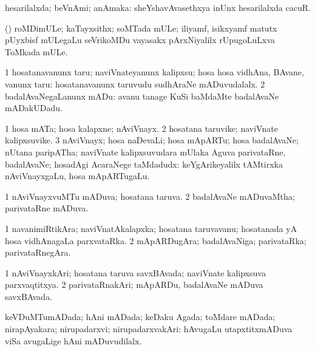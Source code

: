 \bentry
{}
\gl{\gu}
\bmng
hesarilalxda; beVnAmi; anAmaka:  sheYshavAvasethxya inUnx hesarilalxda cacuR. 
\emng
\eentry

\bentry
{}
\gl{\nA}
\bmng
(\aMrashA) roMDimULe; kaTayxsithx; soMTada mULe; iliyamf, isikxyamf matutx pUyxbisf mULegaLu seVrikoMDu vayasakx pArxNiyalilx rUpugoLuLxva ToMkada mULe. 
\emng
\eentry

\bentry
{}
\gl{\akirx}
\bmng
\bnum
\num{1} hosatanavanunx taru; naviVnateyanunx kalipxsu; hosa hosa vidhAna, BAvane, \mo vanunx taru:  hosatanavanunx taruvudu sudhAraNe mADuvudalalx. 
\num{2} badalAvaNegaLanunx mADu:  avanu tanage KuSi baMdaMte badalAvaNe mADakUDadu. 
\enum
\emng
\eentry

\bentry
{}
\gl{\nA}
\bmng
\bnum
\num{1} hosa mATa; hosa kalapxne; nAviVnayx. 
\num{2} hosatana taruvike; naviVnate kalipxsuvike. 
\num{3} nAviVnayx; hosa naDevaLi; hosa mApARTu; hosa badalAvaNe; nUtana paripATha; naviVnate kalipxsuvudara mUlaka Aguva parivataRne, badalAvaNe; hosadAgi AcaraNege taMdadudx:  keYgArikeyalilx tAMtirxka nAviVnayxgaLu, hosa mApARTugaLu. 
\enum
\emng
\eentry

\bentry
{}
\gl{\gu}
\bmng
\bnum
\num{1} nAviVnayxvuMTu mADuva; hosatana taruva. 
\num{2} badalAvaNe mADuvaMtha; parivataRne mADuva. 
\enum
\emng
\eentry

\bentry
{}
\gl{\nA}
\bmng
\bnum
\num{1} navanimiRtikAra; naviVnatAkalapxka; hosatana taruvavanu; hosatanada yA hosa vidhAnagaLa parxvataRka. 
\num{2} mApARDugAra; badalAvaNiga; parivataRka; parivataRnegAra. 
\enum
\emng
\eentry

\bentry
{}
\gl{\gu}
\bmng
\bnum
\num{1} nAviVnayxkAri; hosatana taruva savxBAvada; naviVnate kalipxsuva parxvaqtitxya. 
\num{2} parivataRnakAri; mApARDu, badalAvaNe mADuva savxBAvada. 
\enum
\emng
\eentry

\bentry
{}
\gl{\gu}
\bmng
keVDuMTumADada; hAni mADada; keDaku Agada; toMdare mADada; nirapAyakara; nirupadarxvi; nirupadarxvakAri:  hAvugaLu utapxtitxmADuva viSa avugaLige hAni mADuvudilalx. 
\emng
\eentry

